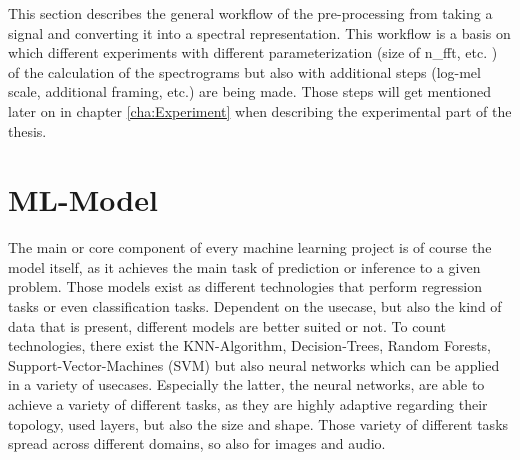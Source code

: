 This section describes the general workflow of the pre-processing from taking a signal and converting it into a spectral representation. This workflow is a basis on which different experiments with different parameterization (size of n\_fft, etc. ) of the calculation of the spectrograms but also with additional steps (log-mel scale, additional framing, etc.) are being made. Those steps will get mentioned later on in chapter \ref{cha:Experiment} when describing the experimental part of the thesis.

\section{ML-Model}
\label{sec:app_model}
The main or core component of every machine learning project is of course the model itself, as it achieves the main task of prediction or inference to a given problem. Those models exist as different technologies that perform regression tasks or even classification tasks. Dependent on the usecase, but also the kind of data that is present, different models are better suited or not. To count technologies, there exist the KNN-Algorithm, Decision-Trees, Random Forests, Support-Vector-Machines (SVM) but also neural networks which can be applied in a variety of usecases. Especially the latter, the neural networks, are able to achieve a variety of different tasks, as they are highly adaptive regarding their topology, used layers, but also the size and shape. Those variety of different tasks spread across different domains, so also for images and audio. 

